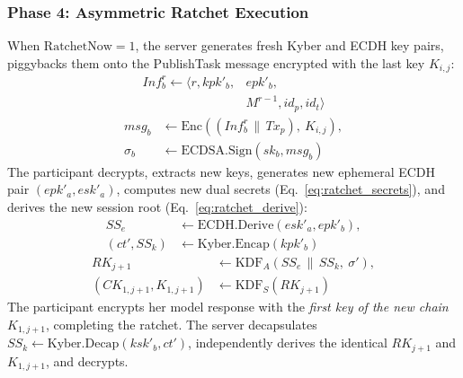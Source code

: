 \documentclass[journal, 10pt, twocolumn]{IEEEtran}
\begin{document}
\subsubsection{Phase 4: Asymmetric Ratchet Execution}
When $\text{RatchetNow}=1$, the server generates fresh Kyber and ECDH key pairs, piggybacks them onto the PublishTask message encrypted with the last key $K_{i,j}$:
\begin{equation}
\begin{split}
Inf_b^r \leftarrow \langle r, kpk'_b,& epk'_b, \\
                  & M^{r-1}, id_p, id_t \rangle
\end{split}
\label{eq:ratchet_info}
\end{equation}
\begin{equation}
\begin{split}
msg_b &\leftarrow \text{Enc}((Inf_b^r \,\|\, Tx_p),\ K_{i,j}), \\
\sigma_b &\leftarrow \text{ECDSA.Sign}(sk_b, msg_b)
\end{split}
\label{eq:ratchet_send}
\end{equation}
The participant decrypts, extracts new keys, generates new ephemeral ECDH pair $(epk'_a, esk'_a)$, computes new dual secrets (Eq.~\eqref{eq:ratchet_secrets}), and derives the new session root (Eq.~\eqref{eq:ratchet_derive}):
\begin{equation}
\begin{split}
SS_e &\leftarrow \text{ECDH.Derive}(esk'_a, epk'_b), \\
(ct', SS_k) &\leftarrow \text{Kyber.Encap}(kpk'_b)
\end{split}
\label{eq:ratchet_secrets}
\end{equation}
\begin{equation}
\begin{split}
RK_{j+1} &\leftarrow \text{KDF}_A(SS_e \,\|\, SS_k,\ \sigma'), \\
(CK_{1,j+1}, K_{1,j+1}) &\leftarrow \text{KDF}_S(RK_{j+1})
\end{split}
\label{eq:ratchet_derive}
\end{equation}
The participant encrypts her model response with the \textit{first key of the new chain} $K_{1,j+1}$, completing the ratchet. The server decapsulates $SS_k \leftarrow \text{Kyber.Decap}(ksk'_b, ct')$, independently derives the identical $RK_{j+1}$ and $K_{1,j+1}$, and decrypts.
\end{document}
